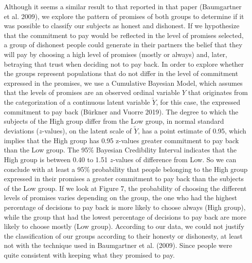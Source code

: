 \documentclass[smallextended]{svjour3}       %
\begin{document}
Although it seems a similar result to that reported in that paper
(Baumgartner et al. 2009), we explore the pattern of promises of both
groups to determine if it was possible to classify our subjects as
honest and dishonest. If we hypothesize that the commitment to pay would
be reflected in the level of promises selected, a group of dishonest
people could generate in their partners the belief that they will pay by
choosing a high level of promises (mostly or always) and, later,
betraying that trust when deciding not to pay back. In order to explore
whether the groups represent populations that do not differ in the level
of commitment expressed in the promises, we use a Cumulative Bayesian
Model, which assumes that the levels of promises are an observed ordinal
variable \(Y\) that originates from the categorization of a continuous
latent variable \(\tilde{Y}\), for this case, the expressed commitment
to pay back (Bürkner and Vuorre 2019). The degree to which the subjects
of the High group differ from the Low group, in normal standard
deviations (\(z\)-values), on the latent scale of \(\tilde{Y}\), has a
point estimate of 0.95, which implies that the High group has 0.95
z-values greater commitment to pay back than the Low group. The 95\%
Bayesian Credibility Interval indicates that the High group is between
0.40 to 1.51 \(z\)-values of difference from Low. So we can conclude
with at least a 95\% probability that people belonging to the High group
expressed in their promises a greater commitment to pay back than the
subjects of the Low group. If we look at Figure 7, the probability of
choosing the different levels of promises varies depending on the group,
the one who had the highest percentage of decisions to pay back is more
likely to choose always (High group), while the group that had the
lowest percentage of decisions to pay back are more likely to choose
mostly (Low group). According to our data, we could not justify the
classification of our groups according to their honesty or dishonesty,
at least not with the technique used in Baumgartner et al. (2009). Since
people were quite consistent with keeping what they promised to pay.
\end{document}
